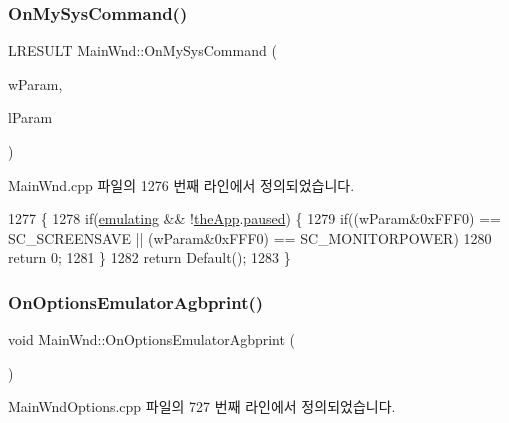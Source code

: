 \subsubsection{\texorpdfstring{On\+My\+Sys\+Command()}{OnMySysCommand()}}
{\footnotesize\ttfamily L\+R\+E\+S\+U\+LT Main\+Wnd\+::\+On\+My\+Sys\+Command (\begin{DoxyParamCaption}\item[{W\+P\+A\+R\+AM}]{w\+Param,  }\item[{L\+P\+A\+R\+AM}]{l\+Param }\end{DoxyParamCaption})}



Main\+Wnd.\+cpp 파일의 1276 번째 라인에서 정의되었습니다.


\begin{DoxyCode}
1277 \{
1278   \textcolor{keywordflow}{if}(\mbox{\hyperlink{gb_globals_8h_af9cc36078b1b311753963297ae7f2a74}{emulating}} && !\mbox{\hyperlink{_v_b_a_8cpp_a8095a9d06b37a7efe3723f3218ad8fb3}{theApp}}.\mbox{\hyperlink{class_v_b_a_af7447bf3bf3f93948d2757e4cb223cfc}{paused}}) \{
1279     \textcolor{keywordflow}{if}((wParam&0xFFF0) == SC\_SCREENSAVE || (wParam&0xFFF0) == SC\_MONITORPOWER)
1280       \textcolor{keywordflow}{return} 0;
1281   \}
1282   \textcolor{keywordflow}{return} Default();
1283 \}
\end{DoxyCode}
\mbox{\label{class_main_wnd_ac4ff3f77ecc063505ba2565d5f54277b}} 
\subsubsection{\texorpdfstring{On\+Options\+Emulator\+Agbprint()}{OnOptionsEmulatorAgbprint()}}
{\footnotesize\ttfamily void Main\+Wnd\+::\+On\+Options\+Emulator\+Agbprint (\begin{DoxyParamCaption}{ }\end{DoxyParamCaption})\hspace{0.3cm}{\ttfamily [protected]}}



Main\+Wnd\+Options.\+cpp 파일의 727 번째 라인에서 정의되었습니다.


